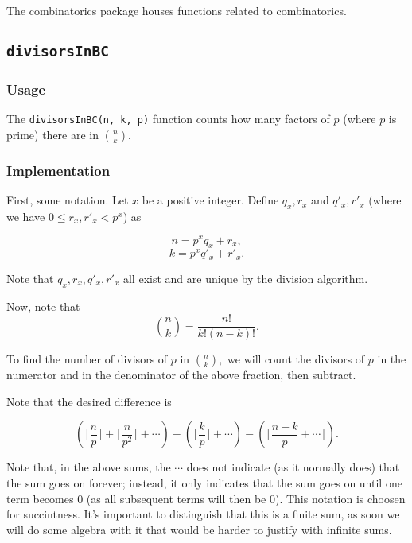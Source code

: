 \documentclass[..docs.tex]{subfiles}
\def\code#1{\texttt{#1}}
\begin{document}
The combinatorics package houses functions related to combinatorics.

\subsection{\code{divisorsInBC}}

\subsubsection{Usage}

The \code{divisorsInBC(n, k, p)} function counts how many factors of $p$ (where $p$ is prime) there are in $\binom{n}{k}.$

\subsubsection{Implementation}

First, some notation. Let $x$ be a positive integer. Define $q_x, r_x$ and $q'_x, r'_x$ (where we have $0 \leq r_x, r'_x < p^x$) as

$$n = p^{x}q_x + r_x,$$
$$k = p^{x}q'_x + r'_x.$$

Note that $q_x, r_x, q'_x, r'_x$ all exist and are unique by the division algorithm.

\vspace{5mm}

Now,  note that $$\binom{n}{k} = \frac{n!}{k!(n-k)!}.$$

To find the number of divisors of $p$ in $\binom{n}{k},$ we will count the divisors of $p$ in the numerator and in the denominator of the above fraction, then subtract.

Note that the desired difference is

$$\left(\lfloor \frac{n}{p} \rfloor + \lfloor \frac{n}{p^2} \rfloor + \cdots \right) - \left(\lfloor \frac{k}{p} \rfloor + \cdots\right) - \left(\lfloor \frac{n-k}{p} + \cdots \rfloor\right).$$

Note that, in the above sums, the $\cdots$ does not indicate (as it normally does) that the sum goes on forever; instead, it only indicates that the sum goes on until one term becomes $0$ (as all subsequent terms will then be $0$). This notation is choosen for succintness.  It's important to distinguish that this is a finite sum, as soon we will do some algebra with it that would be harder to justify with infinite sums.

\vspace{5mm}
\end{document}
